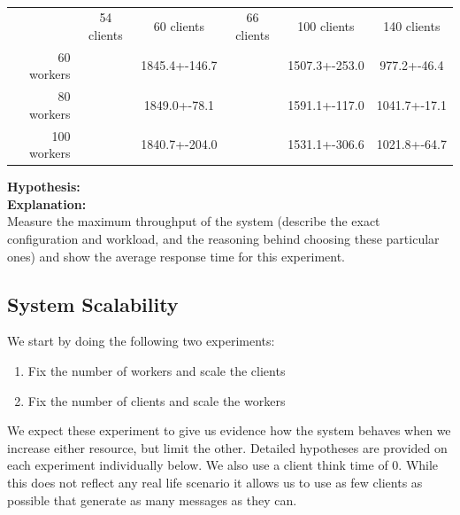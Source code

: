 \documentclass[11pt]{article}
\begin{document}
\begin{table}
  \caption{}
  \begin{center}
    \begin{tabular}{ r|c|c|c|c|c| }
    \multicolumn{1}{r}{}
     & \multicolumn{1}{c}{54 clients}
     & \multicolumn{1}{c}{60 clients}
     & \multicolumn{1}{c}{66 clients}
     & \multicolumn{1}{c}{100 clients}
     & \multicolumn{1}{c}{140 clients} \\
    \cline{2-6}
    60 workers & & 1845.4+-146.7 & & 1507.3+-253.0
& 977.2+-46.4\\     
    \cline{2-6}
    80 workers & & 1849.0+-78.1 & 
& 1591.1+-117.0
&1041.7+-17.1
\\
    \cline{2-6}
    100 workers & & 1840.7+-204.0 &
& 1531.1+-306.6
&1021.8+-64.7
\\
    \cline{2-6}
    \end{tabular}
  \end{center}
    \label{tab:}
\end{table}
\textbf{Hypothesis:}\\

\textbf{Explanation:}\\
Measure the maximum throughput of the system (describe the exact
configuration and workload, and the reasoning behind choosing these
particular ones) and show the average response time for this experiment.

\subsection{System Scalability}\label{sec:system-scalability}

We start by doing the following two experiments:
\begin{enumerate}
  \item Fix the number of workers and scale the clients
  \item Fix the number of clients and scale the workers
\end{enumerate}
We expect these experiment to give us evidence how the system behaves when we increase either resource, but limit the other. Detailed hypotheses are provided on each experiment individually below.
We also use a client think time of 0. While this does not reflect any real life scenario it allows us to use as few clients as possible that generate as many messages as they can.
\end{document}
